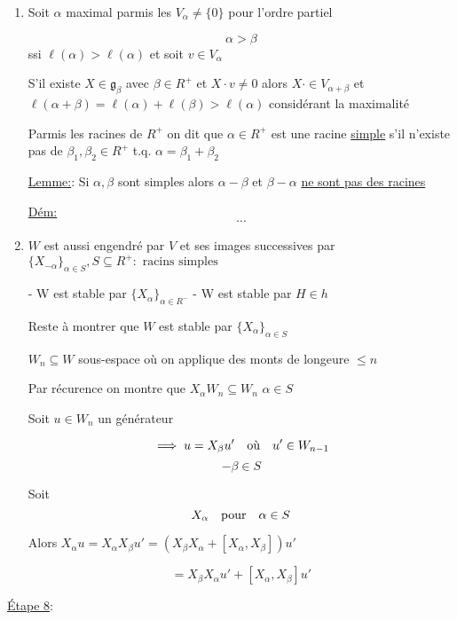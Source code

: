 \begin{enumerate}[label=(\roman*)]
	\item Soit \(\alpha \) maximal parmis les \(V_{\alpha} \neq \{ 0 \} \) pour l'ordre partiel 

		\[ \alpha > \beta  \] ssi \(\ell (\alpha ) > \ell (\alpha) \)
		et soit \(v \in V_{\alpha} \)



		S'il existe \(X \in \mathfrak{g}_\beta \) avec \(\beta \in R^{+}\) et \(X \cdot  v \neq 0\) alors \( X \cdot  \in V_{\alpha+\beta} \)
		et \( \ell(\alpha +\beta ) = \ell (\alpha ) + \ell( \beta) > \ell (\alpha) \) considérant la maximalité 

	 Parmis les racines de \(R^{+}\) on dit que \(\alpha \in R^{+}\) est une racine \underline{simple} s'il n'existe pas de \(\beta_1 , \beta _2 \in R^{+}\) t.q. \(\alpha = \beta_1 + \beta_2 \) 
	
\underline{Lemme:}: Si \(\alpha , \beta \) sont simples alors \( \alpha - \beta \)  et \(\beta -\alpha\) \underline{ne sont pas des racines } 

\underline{Dém:} \[ \dotsb \] 

\item \(W\) est aussi engendré par \(V\) et ses images successives par \(\{X_{-\alpha}\}_{\alpha \in S}, S \subseteq R^{+}: \text{ racins simples }  \) 

- W est stable par \(\{ X_\alpha \}_{\alpha\in R^{-}} \)
- W est stable par \(H \in h\)

Reste à montrer que \( W\) est stable par \(\{ X_{\alpha}  \}_{\alpha \in S} \)

\(W_n \subseteq W\) sous-espace où on applique des monts de longeure \(\leq n\)


Par récurence on montre que \(X_{\alpha} W_n \subseteq W_n \) \(\alpha \in S\)


Soit \(u \in W_n \) un générateur 


\[ \implies u = X_{\beta} u' \qq{où} u' \in W_{n-1}  \]
\[ -\beta \in S \]

Soit \[ X_{\alpha} \qq{pour} \alpha \in S \]


Alors \(X_{\alpha} u = X_{\alpha} X_{\beta} u' = \left( X_{\beta} X_{\alpha} + [X_{\alpha}, X_{\beta} ]  \right) u' \)

\[ = X_{\beta} X_{\alpha} u' + [X_{\alpha}, X_{\beta} ] u' \]

\end{enumerate}

\underline{Étape 8}:

